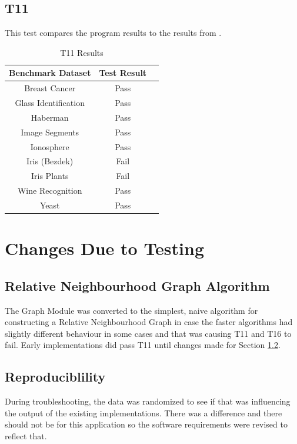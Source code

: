 \documentclass[12pt, titlepage]{article}
\begin{document}
\subsection{T11} \label{sec:T11}

This test compares the program results to the results from \cite{pythonRNG}.

\begin{table}[H]
\centering
\begin{tabular}{|c|c|c|}
\hline
Benchmark Dataset & Test Result \\ \hline
Breast Cancer &  Pass \\ \hline
Glass Identification &  Pass \\ \hline
Haberman  &  Pass \\ \hline
Image Segments &   Pass \\ \hline
Ionosphere &   Pass \\ \hline
Iris (Bezdek) &  Fail \\ \hline
Iris Plants &  Fail \\ \hline
Wine Recognition &  Pass \\ \hline
Yeast & Pass \\ \hline
\end{tabular}
\caption{T11 Results}
\label{Table:t11}
\end{table}




\section{Changes Due to Testing}

\subsection{Relative Neighbourhood Graph Algorithm}
The Graph Module was converted to the simplest, naive algorithm for constructing a Relative Neighbourhood Graph in case the faster algorithms had slightly different behaviour in some cases and that was causing T11 and T16 to fail.
Early implementations did pass T11 until changes made for Section \ref{sec:change repro}.

\subsection{Reproduciblility} \label{sec:change repro}
During troubleshooting, the data was randomized to see if that was influencing the output of the existing implementations.
There was a difference and there should not be for this application so the software requirements were revised to reflect that.
\end{document}
